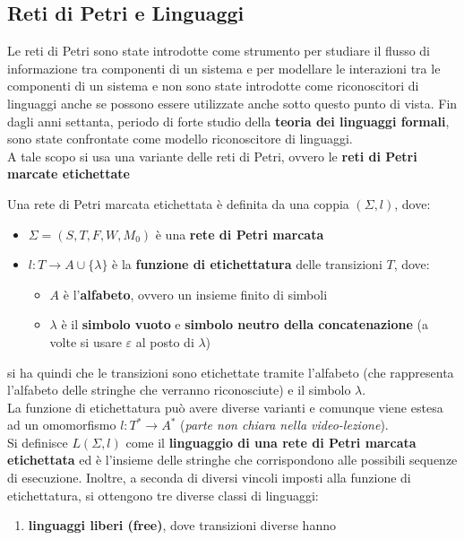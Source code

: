 \documentclass[a4paper,12pt, oneside]{book}
\begin{document}
\subsection{Reti di Petri e Linguaggi}
Le reti di Petri sono state introdotte come strumento per studiare il flusso di
informazione tra componenti di un sistema e per modellare le interazioni tra le
componenti di un sistema e non sono state introdotte come riconoscitori di
linguaggi anche se possono essere utilizzate anche sotto questo punto di
vista. Fin dagli anni settanta, periodo di forte studio della \textbf{teoria dei
linguaggi formali}, sono state confrontate come modello riconoscitore di
linguaggi.\\
A tale scopo si usa una variante delle reti di Petri, ovvero le \textbf{reti di
  Petri marcate etichettate}
\begin{definizione}
  Una rete di Petri marcata etichettata è definita da una coppia $(\Sigma, l)$,
  dove:
  \begin{itemize}
    \item $\Sigma =(S, T , F , W ,M_0)$ è una \textbf{rete di Petri marcata}
    \item $l:T\to A\cup\{\lambda\}$ è la \textbf{funzione di etichettatura}
    delle transizioni $T$, dove:
    \begin{itemize}
      \item $A$ è l'\textbf{alfabeto}, ovvero un insieme finito di simboli
      \item $\lambda$ è il \textbf{simbolo vuoto} e \textbf{simbolo neutro della
        concatenazione} (a volte si usare $\varepsilon$ al posto di $\lambda$)
    \end{itemize}
  \end{itemize}
  si ha quindi che le transizioni sono etichettate tramite l'alfabeto (che
  rappresenta l'alfabeto delle stringhe che verranno riconosciute) e il
  simbolo $\lambda$. \\
  La funzione di etichettatura può avere diverse varianti e comunque viene
  estesa ad un omomorfismo $l:T^*\to A^*$ (\emph{parte non chiara nella
    video-lezione}).\\
  Si definisce $L(\Sigma, l)$ come il \textbf{linguaggio di una rete di Petri
    marcata etichettata} ed è l'insieme delle stringhe che corrispondono alle
  possibili sequenze di esecuzione. Inoltre, a seconda di diversi vincoli
  imposti alla funzione di etichettatura, si ottengono tre diverse classi di
  linguaggi:
  \begin{enumerate}
    \item \textbf{linguaggi liberi (free)}, dove transizioni diverse hanno

\end{enumerate}
\end{definizione}
\end{document}
